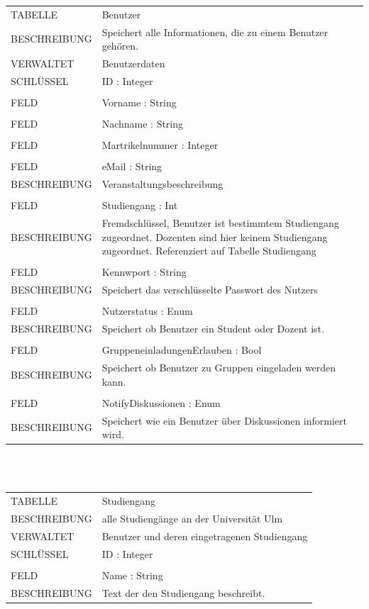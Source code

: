\documentclass[12pt]{scrreprt}
\begin{document}
\begin{tabular}{|lp{12cm}|}
	\hline
	TABELLE			&  Benutzer\\ 
	BESCHREIBUNG	&  Speichert alle Informationen, die zu einem Benutzer gehören.\\ 
	VERWALTET		& Benutzerdaten\\ 
	SCHLÜSSEL		&  ID : Integer\\ 
	\hline
	&  \\ 
	FELD		    &  Vorname : String\\  
	&  \\ 
	FELD		    &  Nachname : String\\  
	&  \\ 
	FELD		    &  Martrikelnummer : Integer\\  
	&  \\
	FELD		    &  eMail : String\\ 
	BESCHREIBUNG	&  Veranstaltungsbeschreibung\\
	&  \\
	FELD		    &  Studiengang : Int\\ 
	BESCHREIBUNG	&  Fremdschlüssel, Benutzer ist bestimmtem Studiengang zugeordnet. Dozenten sind hier keinem Studiengang zugeordnet. Referenziert auf Tabelle Studiengang\\ 
	&  \\
	FELD		    &  Kennwport : String\\ 
	BESCHREIBUNG	&  Speichert das verschlüsselte Passwort des Nutzers \\
	&  \\
	FELD		    &  Nutzerstatus : Enum\\ 
	BESCHREIBUNG	&  Speichert ob Benutzer ein Student oder Dozent ist.\\
	&  \\
	FELD		    &  GruppeneinladungenErlauben : Bool\\ 
	BESCHREIBUNG	&  Speichert ob Benutzer zu Gruppen eingeladen werden kann.\\
	&  \\
	FELD		    &  NotifyDiskussionen : Enum\\ 
	BESCHREIBUNG	&  Speichert wie ein Benutzer über Diskussionen informiert wird.\\
	\hline
\end{tabular}\\\\

\begin{tabular}{|lp{12cm}|}
	\hline
	TABELLE			&  Studiengang\\ 
	BESCHREIBUNG	&  alle Studiengänge an der Universität Ulm\\ 
	VERWALTET		&  Benutzer und deren eingetragenen Studiengang\\ 
	SCHLÜSSEL		&  ID : Integer\\ 
	\hline
	&  \\
	FELD		    &  Name : String\\ 
	BESCHREIBUNG	&  Text der den Studiengang beschreibt.\\
	\hline
\end{tabular}\\\\
\end{document}
